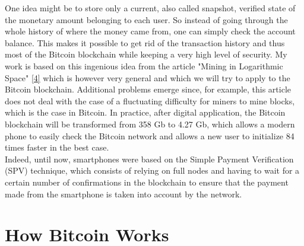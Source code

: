 \documentclass[12pt,a4paper]{article}
\newcommand{\source}[1]{\hyperlink{#1}{[#1]}}
\begin{document}
	One idea might be to store only a current, also called snapshot, verified state of the monetary amount belonging to each user. So instead of going through the whole history of where the money came from, one can simply check the account balance. This makes it possible to get rid of the transaction history and thus most of the Bitcoin blockchain while keeping a very high level of security. My work is based on this ingenious idea from the article "Mining in Logarithmic Space" \source{4} which is however very general and which we will try to apply to the Bitcoin blockchain. Additional problems emerge since, for example, this article does not deal with the case of a fluctuating difficulty for miners to mine blocks, which is the case in Bitcoin. In practice, after digital application, the Bitcoin blockchain will be transformed from 358 Gb to 4.27 Gb, which allows a modern phone to easily check the Bitcoin network and allows a new user to initialize 84 times faster in the best case.\\
	Indeed, until now, smartphones were based on the Simple Payment Verification (SPV) technique, which consists of relying on full nodes and having to wait for a certain number of confirmations in the blockchain to ensure that the payment made from the smartphone is taken into account by the network.\\
	
	\newpage
	
	\section{How Bitcoin Works}
	
\end{document}

